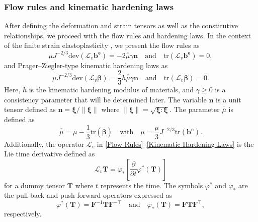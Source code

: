 \documentclass[preprint,11pt]{elsarticle}
\theoremstyle{definition}
\begin{document}
\subsubsection{Flow rules and kinematic hardening laws}

After defining the deformation and strain tensors as well as the constitutive relationships, we proceed with the flow rules and hardening laws. In the context of the finite strain elastoplasticity \citep{simo_framework_1988-1, simo_framework_1988}, we present the flow rules as 
\begin{equation} \label{Flow Rules}
    \mu J^{-2/3} \text{dev}( \mathcal{L}_v \mathbf{b}^\texttt{e} )
    = - 2 \overline{\overline{\mu}} \gamma \mathbf{n}
    \quad \text{and} \quad
    \text{tr}( \mathcal{L}_v \mathbf{b}^\texttt{e} ) = 0,
\end{equation}
and Prager--Ziegler-type kinematic hardening laws as
\begin{equation} \label{Kinematic Hardening Laws}
    \mu J^{-2/3} \text{dev}( \mathcal{L}_v \boldsymbol{\beta} )
    = \dfrac{2}{3} h \overline{\overline{\mu}} \gamma \mathbf{n}
    \quad \text{and} \quad
    \text{tr}( \mathcal{L}_v \boldsymbol{\beta} ) = 0.
\end{equation}
Here, $h$ is the kinematic hardening modulus of materials, and $\gamma \geq 0$ is a consistency parameter that will be determined later. The variable $\mathbf{n}$ is a unit tensor defined as $\mathbf{n} = \boldsymbol{\xi} / \lVert \boldsymbol{\xi} \rVert$ where $\lVert \boldsymbol{\xi} \rVert = \sqrt{\boldsymbol{\xi} : \boldsymbol{\xi}}$. The parameter $\overline{\overline{\mu}}$ is defined as
\begin{equation*}
    \overline{\overline{\mu}} = \overline{\mu} - \dfrac{1}{3} \text{tr}(\overline{\boldsymbol{\beta}})
    \quad \text{with} \quad
    \overline{\mu} = \dfrac{\mu}{3} J^{-2/3} \text{tr}(\mathbf{b}^\texttt{e}).
\end{equation*}
Additionally, the operator $\mathcal{L}_v$ in \eqref{Flow Rules}--\eqref{Kinematic Hardening Laws} is the Lie time derivative defined as
\begin{equation*}
    \mathcal{L}_v \mathbf{T} = \varphi_* \left[ \dfrac{\partial}{\partial t} \varphi^* (\mathbf{T}) \right]
\end{equation*}
for a dummy tensor $\mathbf{T}$ where $t$ represents the time. The symbols $\varphi^*$ and $\varphi_*$ are the pull-back and push-forward operators expressed as
\begin{equation*}
    \varphi^*(\mathbf{T}) = \mathbf{F}^{-1} \mathbf{T} \mathbf{F}^{-\top}
    \quad \text{and} \quad
    \varphi_*(\mathbf{T}) = \mathbf{F} \mathbf{T} \mathbf{F}^\top,
\end{equation*}
respectively.
\end{document}
